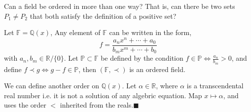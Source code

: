 \documentclass[addpoints]{exam}
\theoremstyle{mytheoremstyle}
\theoremstyle{mytheoremstyle}
\theoremstyle{myproblemstyle}
\begin{document}
\begin{questions}
	\newpage

	\question[1] Can a field be ordered in more than one way? That is, can there be two sets \(P_1 \neq P_2\) that both satisfy the definition of a positive set?
	\begin{solution}
		Let \(\mathbb{F}=\mathbb{Q}(x)\), Any element of \(\mathbb{F}\) can be written in the form,
		\[f=\frac{a_nx^n+\cdots+a_0}{b_mx^m+\cdots+b_0}\]
		with \(a_n,b_m\in\mathbb{R}/\{0\}\). Let \(\mathbb{P}\subset\mathbb{F}\) be defined by the condition \(\displaystyle f\in\mathbb{P}\iff \frac{a_n}{b_m}>0\), and define \(\displaystyle f\prec g\iff g-f\in\mathbb{P}\), then \((\mathbb{F},\prec)\) is an ordered field.

		We can define another order on \(\mathbb{Q}(x)\). Let \(\alpha\in\mathbb{R}\), where \(\alpha\) is a transcendental real number i.e. it is not a solution of any algebric equation. Map \(x\longmapsto\alpha\), and uses the order \(<\) inherited from the reals.\hfill\(\blacksquare\)
	\end{solution}
\end{questions}
\end{document}
